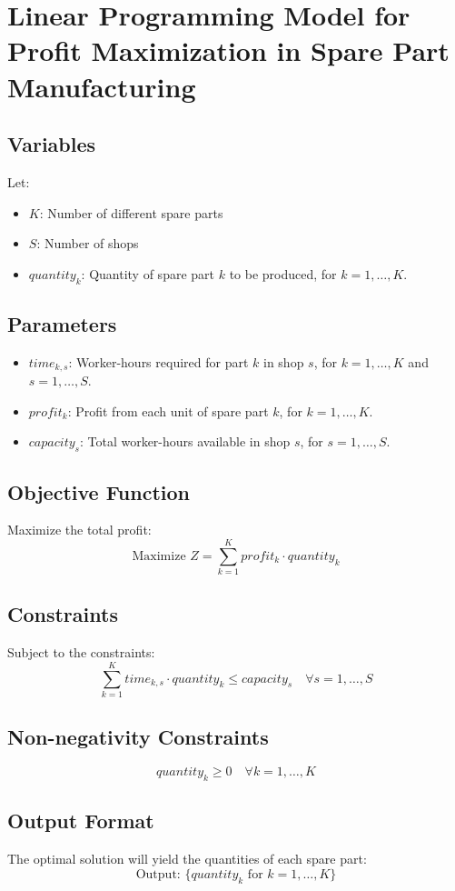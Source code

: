 \documentclass{article}
\begin{document}
\section*{Linear Programming Model for Profit Maximization in Spare Part Manufacturing}

\subsection*{Variables}
Let:
\begin{itemize}
    \item $K$: Number of different spare parts
    \item $S$: Number of shops
    \item $quantity_k$: Quantity of spare part $k$ to be produced, for $k = 1, \ldots, K$.
\end{itemize}

\subsection*{Parameters}
\begin{itemize}
    \item $time_{k,s}$: Worker-hours required for part $k$ in shop $s$, for $k = 1, \ldots, K$ and $s = 1, \ldots, S$.
    \item $profit_k$: Profit from each unit of spare part $k$, for $k = 1, \ldots, K$.
    \item $capacity_s$: Total worker-hours available in shop $s$, for $s = 1, \ldots, S$.
\end{itemize}

\subsection*{Objective Function}
Maximize the total profit:
\[
\text{Maximize } Z = \sum_{k=1}^{K} profit_k \cdot quantity_k
\]

\subsection*{Constraints}
Subject to the constraints:
\[
\sum_{k=1}^{K} time_{k, s} \cdot quantity_k \leq capacity_s \quad \forall s = 1, \ldots, S
\]

\subsection*{Non-negativity Constraints}
\[
quantity_k \geq 0 \quad \forall k = 1, \ldots, K
\]

\subsection*{Output Format}
The optimal solution will yield the quantities of each spare part:
\[
\text{Output: } \{ quantity_k \text{ for } k = 1, \ldots, K \}
\]
\end{document}
